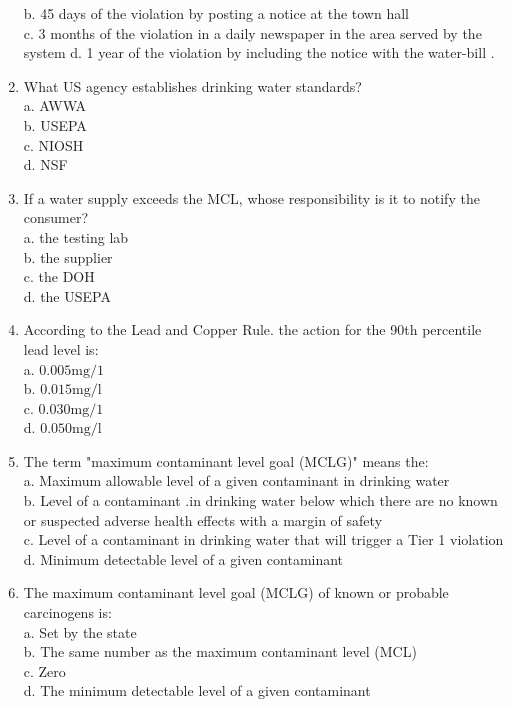 \begin{enumerate}
b. 45 days of the violation by posting a notice at the town hall\\
c. 3 months of the violation in a daily newspaper in the area served by the system d. 1 year of the violation by including the notice with the water-bill .\\
\item What US agency establishes drinking water standards?\\
a. AWWA\\
b. USEPA\\
c. NIOSH\\
d. NSF\\
\item If a water supply exceeds the MCL, whose responsibility is it to notify the consumer?\\
a. the testing lab\\
b. the supplier\\
c. the DOH\\
d. the USEPA\\
\item According to the Lead and Copper Rule. the action for the 90th percentile lead level is:\\
a. $0.005 \mathrm{mg} / 1$\\
b. $0.015 \mathrm{mg} / \mathrm{l}$\\
c. $0.030 \mathrm{mg} / 1$\\
d. $0.050 \mathrm{mg} / \mathrm{l}$\\
\item The term "maximum contaminant level goal (MCLG)" means the:\\
a. Maximum allowable level of a given contaminant in drinking water\\
b. Level of a contaminant .in drinking water below which there are no known or suspected adverse health effects with a margin of safety\\
c. Level of a contaminant in drinking water that will trigger a Tier 1 violation\\
d. Minimum detectable level of a given contaminant\\
\item The maximum contaminant level goal (MCLG) of known or probable carcinogens is:\\
a. Set by the state\\
b. The same number as the maximum contaminant level (MCL)\\
c. Zero\\
d. The minimum detectable level of a given contaminant\\

\end{enumerate}
